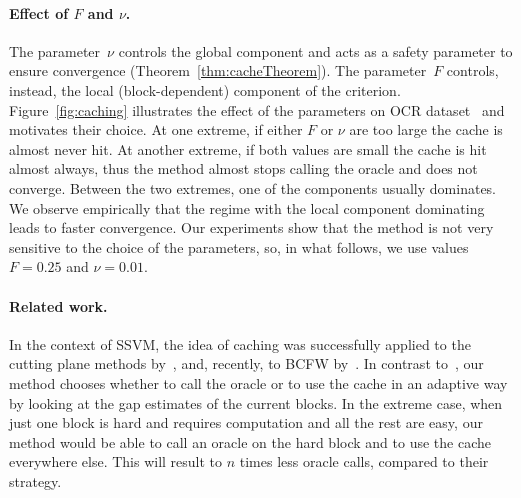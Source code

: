 \documentclass{article}
\begin{document}
\paragraph{Effect of $F$ and $\nu$.}
The parameter~$\nu$ controls the global component and acts as a safety parameter to ensure convergence (Theorem~\ref{thm:cacheTheorem}).
The parameter~$F$ controls, instead, the local (block-dependent) component of the criterion.
Figure~\ref{fig:caching} illustrates the effect of the parameters on OCR dataset~\citep{Taskar2003} and motivates their choice.
At one extreme, if either $F$ or $\nu$ are too large the cache is almost never hit.
At another extreme, if both values are small the cache is hit almost always, thus the method almost stops calling the oracle and does not converge.
Between the two extremes, one of the components usually dominates.
We observe empirically that the regime with the local component dominating leads to faster convergence.
Our experiments show that the method is not very sensitive to the choice of the parameters, so, in what follows, we use values $F=0.25$ and $\nu=0.01$.

%
%
%
%
%
%
%

%
%

\vspace{-1mm}
\paragraph{Related work.}
In the context of SSVM, the idea of caching was successfully applied to the cutting plane methods by~\citet{Joachims:2009ex}, and, recently, to BCFW by~\citet{shah2015caching}. 
In contrast to~\citet{shah2015caching}, our method chooses whether to call the oracle or to use the cache in an adaptive way by looking at the gap estimates of the current blocks.
In the extreme case, when just one block is hard and requires computation and all the rest are easy, our method would be able to call an oracle on the hard block and to use the cache everywhere else. This will result to $n$ times less oracle calls, compared to their strategy.
\end{document}
